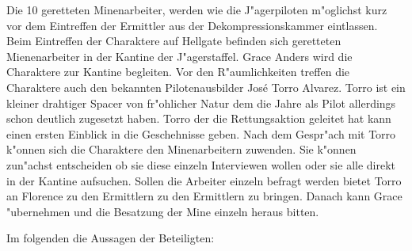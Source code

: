 

Die 10 geretteten Minenarbeiter, werden wie die J"agerpiloten m"oglichst kurz vor dem Eintreffen der Ermittler aus der Dekompressionskammer eintlassen. Beim Eintreffen der Charaktere auf Hellgate befinden sich geretteten Mienenarbeiter in der Kantine der J"agerstaffel. Grace Anders wird die Charaktere zur Kantine begleiten. Vor den R"aumlichkeiten treffen die Charaktere auch den bekannten Pilotenausbilder Jos\'{e} \frqq{}Torro\flqq{} Alvarez. Torro ist ein kleiner drahtiger Spacer von fr"ohlicher Natur dem die Jahre als Pilot allerdings schon deutlich zugesetzt haben. Torro der die Rettungsaktion geleitet hat kann einen ersten Einblick in die Geschehnisse geben. Nach dem Gespr"ach mit Torro k"onnen sich die Charaktere den Minenarbeitern zuwenden. Sie k"onnen zun"achst entscheiden ob sie diese einzeln Interviewen wollen oder sie alle direkt in der Kantine aufsuchen. Sollen die Arbeiter einzeln befragt werden bietet Torro an Florence zu den Ermittlern zu den Ermittlern zu bringen. Danach kann Grace "ubernehmen und die Besatzung der Mine einzeln heraus bitten.

Im folgenden die Aussagen der Beteiligten:


